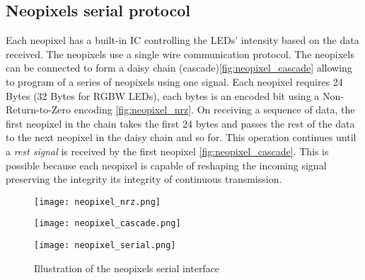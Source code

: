 \subsection{Neopixels serial protocol}
Each neopixel has a built-in IC controlling the LEDs' intensity based on the data received. The neopixels use a single wire communication protocol. The neopixels can be connected to form a daisy chain (cascade)\cref{fig:neopixel_cascade} allowing to program of a series of neopixels using one signal. Each neopixel requires 24 Bytes (32 Bytes for RGBW LEDs), each bytes is an encoded bit using a Non-Return-to-Zero encoding \cref{fig:neopixel_nrz}. On receiving a sequence of data, the first neopixel in the chain takes the first 24 bytes and passes the rest of the data to the next neopixel in the daisy chain and so for. This operation continues until a \textit{rest signal} is received by the first neopixel \cref{fig:neopixel_cascade}. This is possible because each neopixel is capable of reshaping the incoming signal preserving the integrity its integrity of continuous transmission.

\begin{figure}[h!]
\centering
\begin{minipage}[b]{0.45\textwidth}
\texttt{[image: neopixel\_nrz.png]}
\label{fig:neopixel_nrz}
\end{minipage}
\begin{minipage}[b]{0.45\textwidth}
\texttt{[image: neopixel\_cascade.png]}
\label{fig:neopixel_cascade}
\end{minipage}
\begin{minipage}[b]{\textwidth}
\texttt{[image: neopixel\_serial.png]}
\label{fig:neopixel_cascade}
\end{minipage}
\caption{Illustration of the neopixels serial interface}
\label{fig:neopixel_protocol}
\end{figure}
 
